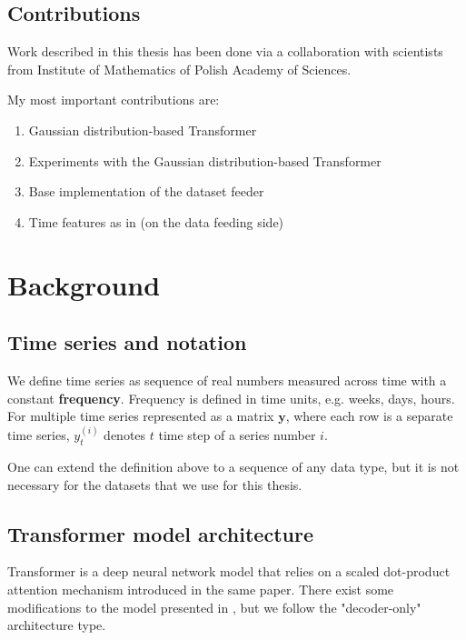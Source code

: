 \documentclass[en]{pracamgr}
\begin{document}
\section*{Contributions}\label{r:contributions}

Work described in this thesis has been done via a collaboration with scientists from Institute of Mathematics of Polish Academy of Sciences.

My most important contributions are:
\begin{enumerate}
	\item Gaussian distribution-based Transformer
	\item Experiments with the Gaussian distribution-based Transformer
	\item Base implementation of the dataset feeder
	\item Time features as in \cite{enhancing} (on the data feeding side)
\end{enumerate}

\chapter{Background}\label{r:background}

\section{Time series and notation}

We define time series as sequence of real numbers measured across time with a constant \textbf{frequency}. Frequency is defined in time units, e.g. weeks, days, hours. For multiple time series represented as a matrix $\textbf{y}$, where each row is a separate time series, $y^{(i)}_t$ denotes $t$ time step of a series number $i$.

One can extend the definition above to a sequence of any data type, but it is not necessary for the datasets that we use for this thesis.


\section{Transformer model architecture}\label{s:architecture}

Transformer \cite{tr} is a deep neural network model that relies on a scaled dot-product attention mechanism introduced in the same paper. There exist some modifications to the model presented in \cite{tr}, but we follow the "decoder-only" \cite{wikipedia} architecture type.
\end{document}
